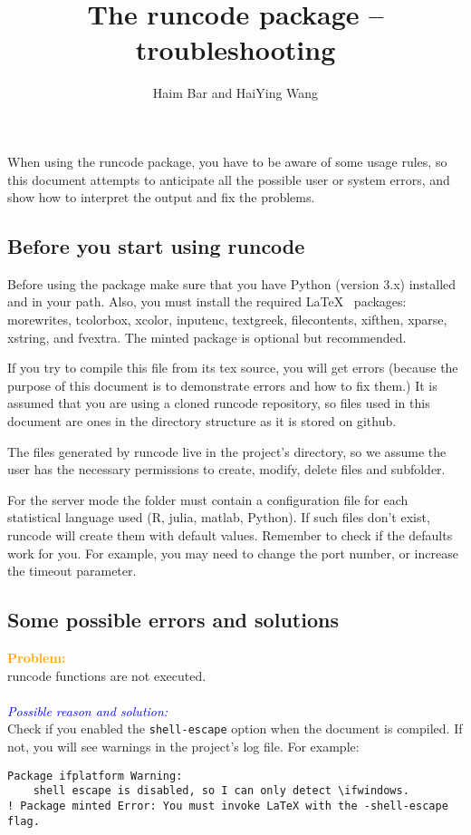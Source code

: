 \documentclass[a4paper,10pt]{article}
\title{The runcode package -- troubleshooting}
\author{Haim Bar and HaiYing Wang}
\newcommand{\prob}[1] {\bigskip\noindent\textbf{\textcolor{orange}{Problem:}}\\#1\\\\}
\newcommand{\cause}[1] {\noindent\textit{\textcolor{blue}{Possible reason and solution:}}\\#1}
\begin{document}
\maketitle

When using the runcode package, you have to be aware of some usage rules, so this document attempts to anticipate all the possible user or system errors, and show how to interpret the output and fix the problems.

\subsection*{Before you start using runcode}

Before using the package make sure that you have Python (version 3.x) installed and in your path. Also, you must install the required \LaTeX~ packages: 
morewrites, tcolorbox, xcolor, inputenc, textgreek, filecontents, xifthen, xparse, xstring, and fvextra. The minted package is optional but recommended.

If you try to compile this file from its tex source, you will get errors (because the purpose of this document is to demonstrate errors and how to fix them.) It is assumed that you are using a cloned runcode repository, so files used in this document are ones in the directory structure as it is stored on github.

The files generated by runcode live in the project's directory, so we assume the user has the necessary permissions to create, modify, delete files and subfolder.

For the server mode the folder must contain a configuration file for each statistical language used (R, julia, matlab, Python). If such files don't exist, runcode will create them with default values. Remember to check if the defaults work for you. For example, you may need to change the port number, or increase the timeout parameter.

\subsection*{Some possible errors and solutions}


\prob{runcode functions are not executed.}
\cause\bgroup
Check if you enabled the \verb|shell-escape| option when the document is compiled. If not, you will see warnings in the project's log file. For example:
\begin{Verbatim}
Package ifplatform Warning: 
    shell escape is disabled, so I can only detect \ifwindows.
! Package minted Error: You must invoke LaTeX with the -shell-escape flag.
\end{Verbatim}
\egroup
\end{document}
